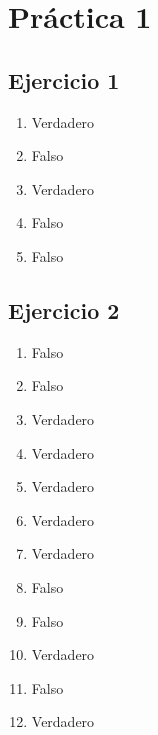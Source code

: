 
\usepackage{caratula}
\usepackage{enumerate}
\usepackage{hyperref}
\usepackage{graphicx}
\usepackage{amsfonts}
\usepackage{enumitem}
\usepackage{amsmath}

\decimalpoint
\hypersetup{colorlinks=true, linkcolor=black, urlcolor=blue}
\setlength{\parindent}{0em}
\setlength{\parskip}{0.5em}
\setcounter{tocdepth}{2} %
\setcounter{section}{0} %
\renewcommand{\thesubsubsection}{\thesubsection.\Alph{subsubsection}}
\graphicspath{ {images/} }





\maketitle
\newpage

\tableofcontents
\newpage

\section{Práctica 1}

\subsection{Ejercicio 1}
\begin{enumerate}[label=(\alph*)]
    \item Verdadero
    \item Falso
    \item Verdadero
    \item Falso
    \item Falso
\end{enumerate}

\subsection{Ejercicio 2}
\begin{enumerate}[label=(\alph*)]
    \item Falso
    \item Falso
    \item Verdadero
    \item Verdadero
    \item Verdadero
    \item Verdadero
    \item Verdadero
    \item Falso
    \item Falso
    \item Verdadero
    \item Falso
    \item Verdadero
\end{enumerate}

